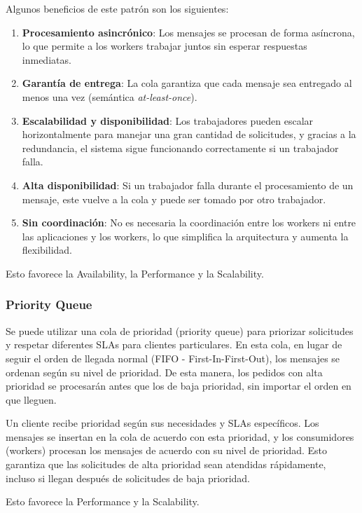 \documentclass{article}
\begin{document}
		Algunos beneficios de este patrón son los siguientes:
		\begin{enumerate}
			\item \textbf{Procesamiento asincrónico}: Los mensajes se procesan de forma asíncrona, lo que permite a los workers trabajar juntos sin esperar respuestas inmediatas.
			
			\item \textbf{Garantía de entrega}: La cola garantiza que cada mensaje sea entregado al menos una vez (semántica \textit{at-least-once}).
			\item \textbf{Escalabilidad y disponibilidad}: Los trabajadores pueden escalar horizontalmente para manejar una gran cantidad de solicitudes, y gracias a la redundancia, el sistema sigue funcionando correctamente si un trabajador falla.
			\item \textbf{Alta disponibilidad}: Si un trabajador falla durante el procesamiento de un mensaje, este vuelve a la cola y puede ser tomado por otro trabajador.
			\item \textbf{Sin coordinación}: No es necesaria la coordinación entre los workers ni entre las aplicaciones y los workers, lo que simplifica la arquitectura y aumenta la flexibilidad.		
				
		\end{enumerate}
		
		
		Esto favorece la Availability, la Performance y la Scalability.
		
		\subsubsection{Priority Queue}
		Se puede utilizar una cola de prioridad (priority queue) para priorizar solicitudes y respetar diferentes SLAs para clientes particulares. En esta cola, en lugar de seguir el orden de llegada normal (FIFO - First-In-First-Out), los mensajes se ordenan según su nivel de prioridad. De esta manera, los pedidos con alta prioridad se procesarán antes que los de baja prioridad, sin importar el orden en que lleguen.
		
		Un cliente recibe prioridad según sus necesidades y SLAs específicos. Los mensajes se insertan en la cola de acuerdo con esta prioridad, y los consumidores (workers) procesan los mensajes de acuerdo con su nivel de prioridad. Esto garantiza que las solicitudes de alta prioridad sean atendidas rápidamente, incluso si llegan después de solicitudes de baja prioridad.
		
		Esto favorece la Performance y la Scalability.
		
\end{document}
